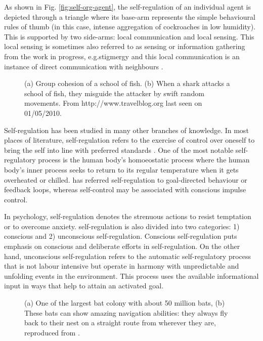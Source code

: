 As shown in Fig. \ref{fig:self-org-agent}, the  self-regulation of an individual agent is depicted through a triangle where its base-arm represents the simple behavioural rules of thumb (in this case, intense aggregation of cockroaches in low humidity). This is supported by two side-arms: local communication and local sensing. This local sensing is sometimes also referred to as sensing or information gathering from the work in progress, e.g.stigmergy and this local communication is an instance of direct communication with neighbours  \cite{Camazine+2001}.

\begin{figure}[htp]
\centering
{} 
\hspace{0.25cm}
\caption{(a) Group cohesion of a school of fish. (b) When a shark attacks a school of fish, they misguide the attacker by swift random movements. From http://www.travelblog.org last seen on 01/05/2010.}
\label{fig:school-of-fish}
\end{figure}
Self-regulation has been studied in many other branches of knowledge. In most places of literature, self-regulation refers to the exercise of control over oneself to bring the self into line with preferred standards \cite{Baumeister+2007}. One of the most notable self-regulatory process is the human body's homoeostatic process where the human body's inner process seeks to return to its regular temperature when it gets overheated or chilled.  has referred self-regulation to goal-directed behaviour or feedback loops, whereas self-control may be associated with conscious impulse control.

In psychology, self-regulation denotes the strenuous actions to resist temptation or to overcome anxiety. self-regulation is also divided into two categories: 1) conscious and 2) unconscious self-regulation. Conscious self-regulation puts emphasis on conscious and deliberate efforts in self-regulation. On the other hand, unconscious self-regulation refers to the automatic self-regulatory process that is not labour intensive but operate in harmony with unpredictable and unfolding events in the environment. This process uses the available informational input in ways that help to attain an activated goal.
\begin{figure}[htp]
\centering
{} 
\hspace{0.25cm}
\caption{(a) One of the largest bat colony with about 50 million bats, (b) These bats can show amazing navigation abilities: they always fly back to their nest on a straight route from wherever they are, reproduced from \protect{}.}
\label{fig:bats-colony}
\end{figure}

